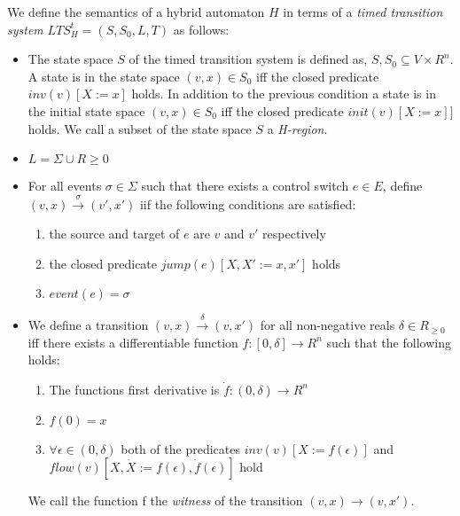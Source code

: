 \medskip
\begin{mydef}
We define the semantics of a hybrid automaton $H$ in terms of a \emph{timed transition system} $LTS^t_H = (S,S_0,L,T)$ as follows:


\begin{itemize}
 
\item The state space $S$ of the timed transition system is defined as, $S, S_0 \subseteq V \times R^n$. A state is in the state space $(v,x) \in S_0$ iff the closed predicate $inv(v)[X := x]$ holds. In addition to the previous condition a state is in the initial state space $(v,x) \in S_0$ iff the closed predicate $init(v)[X := x]]$ holds. We call a subset of the state space $S$ a \emph{H-region}.


\item $L = \Sigma \cup R {\geq 0}$

\item For all events $\sigma \in \Sigma$ such that there exists a control switch $e \in E$, define $(v,x) \xrightarrow{\sigma} (v',x')$ iif the following conditions are satisfied:
\begin{enumerate}
\item the source and target of $e$ are $v$ and $v'$ respectively
\item the closed predicate $jump(e)[X, X' := x,x']$ holds
\item $event(e) = \sigma$
\end{enumerate}

\item We define a transition $(v,x) \xrightarrow{\delta} (v,x')$ for all non-negative reals $\delta \in R_{\geq 0}$ iff there exists a differentiable function $f: [0, \delta] \to R^n$ such that the following holds:
\begin{enumerate}
\item The functions first derivative is $\dot{f} :(0,\delta) \to R^n$
\item $f(0) = x$
\item $\forall \epsilon \in (0,\delta)$ both of the predicates $inv(v)[X := f(\epsilon)]$ and $flow(v)[X,\dot{X} := f(\epsilon),\dot{f}(\epsilon)]$ hold
\end{enumerate}
We call the function f the \emph{witness} of the transition $(v,x) \to (v, x')$.

\end{itemize}


\end{mydef}
